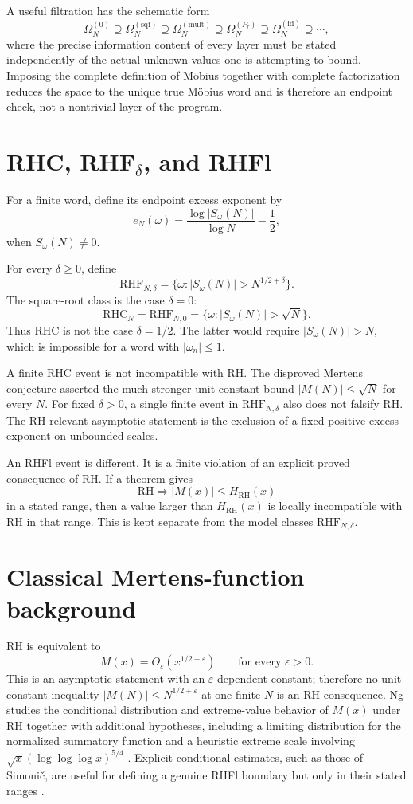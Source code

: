 \documentclass[11pt]{article}
\newcommand{\Om}{\Omega}
\newcommand{\RHC}{\mathrm{RHC}}
\newcommand{\RHF}{\mathrm{RHF}}
\begin{document}
A useful filtration has the schematic form
\[
\Om_N^{(0)}\supseteq
\Om_N^{(\mathrm{sqf})}\supseteq
\Om_N^{(\mathrm{mult})}\supseteq
\Om_N^{(P_r)}\supseteq
\Om_N^{(\mathrm{id})}\supseteq\cdots,
\]
where the precise information content of every layer must be stated independently of the actual unknown values one is attempting to bound.  Imposing the complete definition of Möbius together with complete factorization reduces the space to the unique true Möbius word and is therefore an endpoint check, not a nontrivial layer of the program.

\section{RHC, RHF$_\delta$, and RHFl}
For a finite word, define its endpoint excess exponent by
\[
 e_N(\omega)=\frac{\log|S_\omega(N)|}{\log N}-\frac12,
\]
when $S_\omega(N)\ne0$.

For every $\delta\ge0$, define
\[
 \RHF_{N,\delta}
 =\{\omega:|S_\omega(N)|>N^{1/2+\delta}\}.
\]
The square-root class is the case $\delta=0$:
\[
 \RHC_N=\RHF_{N,0}
 =\{\omega:|S_\omega(N)|>\sqrt N\}.
\]
Thus RHC is not the case $\delta=1/2$. The latter would require $|S_\omega(N)|>N$, which is impossible for a word with $|\omega_n|\le1$.

A finite RHC event is not incompatible with RH. The disproved Mertens conjecture asserted the much stronger unit-constant bound $|M(N)|\le\sqrt N$ for every $N$. For fixed $\delta>0$, a single finite event in $\RHF_{N,\delta}$ also does not falsify RH. The RH-relevant asymptotic statement is the exclusion of a fixed positive excess exponent on unbounded scales.

An RHFl event is different. It is a finite violation of an explicit proved consequence of RH. If a theorem gives
\[
 \mathrm{RH}\Longrightarrow |M(x)|\le H_{\mathrm{RH}}(x)
\]
in a stated range, then a value larger than $H_{\mathrm{RH}}(x)$ is locally incompatible with RH in that range. This is kept separate from the model classes $\RHF_{N,\delta}$.

\section{Classical Mertens-function background}
RH is equivalent to
\[
 M(x)=O_\varepsilon(x^{1/2+\varepsilon})
 \qquad\text{for every }\varepsilon>0.
\]
This is an asymptotic statement with an $\varepsilon$-dependent constant; therefore no unit-constant inequality $|M(N)|\le N^{1/2+\varepsilon}$ at one finite $N$ is an RH consequence.  Ng studies the conditional distribution and extreme-value behavior of $M(x)$ under RH together with additional hypotheses, including a limiting distribution for the normalized summatory function and a heuristic extreme scale involving $\sqrt{x}(\log\log\log x)^{5/4}$ \cite{Ng2004}.  Explicit conditional estimates, such as those of Simonič, are useful for defining a genuine RHFl boundary but only in their stated ranges \cite{Simonic2022}.
\end{document}
